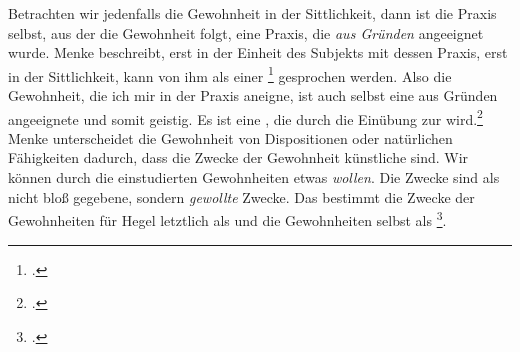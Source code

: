 \documentclass[12pt, a4paper, openany]{report}
\begin{document}
Betrachten wir jedenfalls die Gewohnheit in der Sittlichkeit, dann ist die Praxis selbst, aus der die Gewohnheit folgt, eine Praxis, die \emph{aus Gründen} angeeignet wurde.
Menke beschreibt, erst in der Einheit des Subjekts mit dessen Praxis, erst in der Sittlichkeit, kann von ihm als einer \footcite[][29]{menke_autonomie_2018} gesprochen werden.
Also die Gewohnheit, die ich mir in der Praxis aneigne, ist auch selbst eine aus Gründen angeeignete und somit geistig. 
Es ist eine , die durch die Einübung zur  wird.\footcite[][414]{khurana_freiheit_2017}
Menke unterscheidet die Gewohnheit von Dispositionen oder natürlichen Fähigkeiten dadurch, dass die Zwecke der Gewohnheit künstliche sind.
Wir können durch die einstudierten Gewohnheiten etwas \emph{wollen}.
Die Zwecke sind als nicht bloß gegebene, sondern \emph{gewollte} Zwecke. 
Das bestimmt die Zwecke der Gewohnheiten für Hegel letztlich als  und die Gewohnheiten selbst als \footcite[][131]{menke_autonomie_2018}.\\
\end{document}
